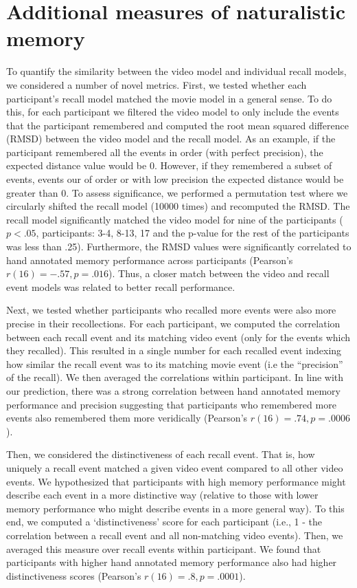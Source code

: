 \documentclass{article}
\begin{document}
\section*{Additional measures of naturalistic memory}
To quantify the similarity between the video model and individual recall models, we considered a number of novel metrics.  First, we tested whether each participant's recall model matched the movie model in a general sense. To do this, for each participant we filtered the video model to only include the events that the participant remembered and computed the root mean squared difference (RMSD) between the video model and the recall model. As an example, if the participant remembered all the events in order (with perfect precision), the expected distance value would be 0. However, if they remembered a subset of events, events our of order or with low precision the expected distance would be greater than 0. To assess significance, we performed a permutation test where we circularly shifted the recall model (10000 times) and recomputed the RMSD. The recall model significantly matched the video model for nine of the participants ($p<.05$, participants: 3-4, 8-13, 17 and the p-value for the rest of the participants was less than .25). Furthermore, the RMSD values were significantly correlated to hand annotated memory performance across participants (Pearson's $r(16)=-.57, p=.016$). Thus, a closer match between the video and recall event models was related to better recall performance.

Next, we tested whether participants who recalled more events were also more precise in their recollections. For each participant, we computed the correlation between each recall event and its matching video event (only for the events which they recalled). This resulted in a single number for each recalled event indexing how similar the recall event was to its matching movie event (i.e the ``precision'' of the recall). We then averaged the correlations within participant. In line with our prediction, there was a strong correlation between hand annotated memory performance and precision suggesting that participants who remembered more events also remembered them more veridically (Pearson's $r(16)=.74, p=.0006$).

Then, we considered the distinctiveness of each recall event. That is, how uniquely a recall event matched a given video event compared to all other video events. We hypothesized that participants with high memory performance might describe each event in a more distinctive way (relative to those with lower memory performance who might describe events in a more general way). To this end, we computed a `distinctiveness' score for each participant (i.e., 1 - the correlation between a recall event and all non-matching video events).  Then, we averaged this measure over recall events within participant.  We found that participants with higher hand annotated memory performance also had higher distinctiveness scores (Pearson's $r(16)=.8, p=.0001$).
\end{document}
